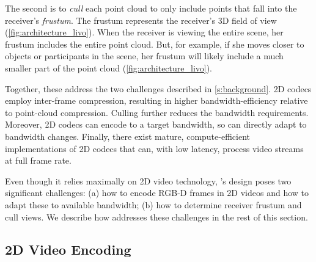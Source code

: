 
The second is to \textit{cull} each point cloud to only include points that fall into the receiver's \textit{frustum}.
%
The frustum represents the receiver's 3D field of view (\cref{fig:architecture_livo}).
%
%
%
When the receiver is viewing the entire scene, her frustum includes the entire point cloud.
%
But, for example, if she moves closer to objects or participants in the scene, her frustum will likely include a much smaller part of the point cloud (\cref{fig:architecture_livo}). 

Together, these address the two challenges described in \cref{s:background}.
%
2D codecs employ inter-frame compression, resulting in higher bandwidth-efficiency relative to point-cloud compression.
%
Culling further reduces the bandwidth requirements.
%
Moreover, 2D codecs can encode to a target bandwidth, so \livo{} can directly adapt to bandwidth changes.
%
Finally, there exist mature, compute-efficient implementations of 2D codecs that can, with low latency, process video streams at full frame rate.

Even though it relies maximally on 2D video technology, \livo{}'s design poses two significant challenges: (a) how to encode RGB-D frames in 2D videos and how to adapt these to available bandwidth; (b) how to determine receiver frustum and cull views.
%
We describe how \livo{} addresses these challenges in the rest of this section.

\subsection{2D Video Encoding}
\label{ss:compression}

